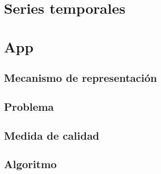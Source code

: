 \documentclass{beamer}
\begin{document}
	\section{Series temporales}
	
	\section{App}
	
	\subsection{Mecanismo de representación}
	\subsection{Problema}
	\subsection{Medida de calidad}
	\subsection{Algoritmo}
	
	
	
	
\end{document}
